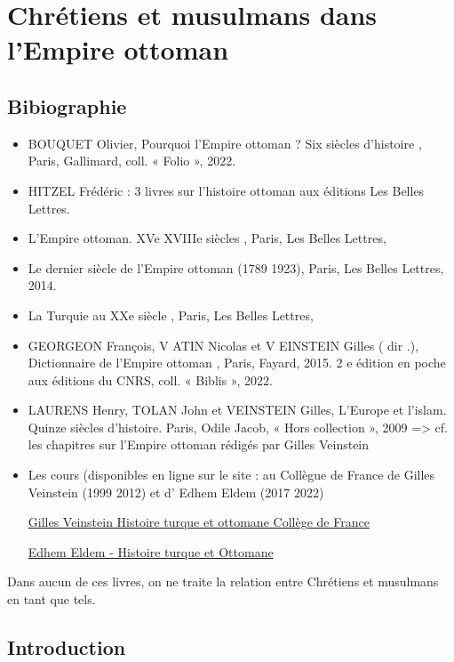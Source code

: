 \chapter{Chrétiens et musulmans dans l’Empire ottoman}


\section{Bibiographie}
\begin{itemize}
    \item BOUQUET Olivier,
Pourquoi l’Empire ottoman ? Six siècles d’histoire , Paris,
Gallimard, coll. « Folio », 2022.
   \item
HITZEL Frédéric : 3 livres sur l’histoire ottoman aux éditions Les Belles Lettres.
   \item
L’Empire ottoman. XVe XVIIIe siècles , Paris, Les Belles Lettres,
   \item
Le dernier siècle de l’Empire ottoman (1789 1923), Paris, Les Belles
Lettres, 2014.
   \item
La Turquie au XXe siècle , Paris, Les Belles Lettres,
   \item
GEORGEON
François, V ATIN Nicolas et V EINSTEIN Gilles ( dir .), Dictionnaire
de l’Empire ottoman , Paris, Fayard, 2015. 2 e édition en poche aux éditions du
CNRS, coll. « Biblis », 2022.
\item
LAURENS Henry, TOLAN John et VEINSTEIN Gilles,
L'Europe et
l’islam. Quinze siècles d’histoire. Paris, Odile Jacob, « Hors collection »,
2009 => cf. les chapitres sur l’Empire ottoman rédigés par Gilles Veinstein
\item
Les cours (disponibles en ligne sur le site : au Collègue de France de Gilles
Veinstein (1999 2012) et d’ Edhem Eldem (2017 2022)

\href{https://www.college-de-france.fr/chaire/gilles-veinstein-histoire-turque-et-ottomane-chaire-statutaire}{Gilles
Veinstein Histoire turque et ottomane Collège de France}

\href{https://www.college-de-france.fr/chaire/edhem-eldem-histoire-turque-et-ottomane-chaire-internationale}{Edhem Eldem - Histoire turque et Ottomane}
\end{itemize}


Dans aucun de ces livres, on ne traite la relation entre Chrétiens et musulmans en tant que tels.


\section{Introduction}

